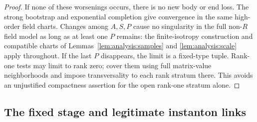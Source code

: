 \begin{proof}
If none of these worsenings occurs, there is no new body or end loss.
The strong bootstrap and exponential completion give convergence in
the same high-order field charts.  Changes among $A,S,P$ cause no
singularity in the full non-$R$ field model as long as at least
one $P$ remains: the finite-isotropy construction and compatible
charts of Lemmas~\ref{lem:analysis:samples} and \ref{lem:analysis:scale}
apply throughout.  If the last $P$ disappears, the limit is a fixed-type
tuple.  Rank-one tests may limit to rank zero; cover them using full
matrix-value neighborhoods and impose transversality to each rank
stratum there.  This avoids an unjustified compactness assertion for
the open rank-one stratum alone.
\end{proof}

\subsection{The fixed stage and legitimate instanton links}

